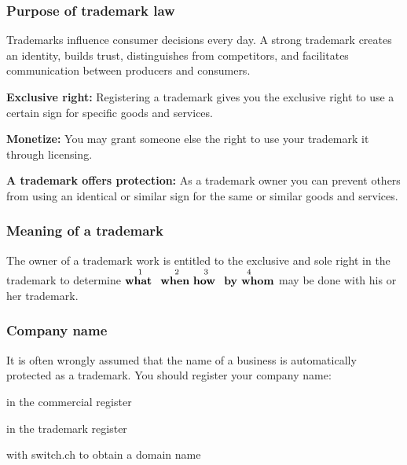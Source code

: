 \subsubsection{Purpose of trademark law}
Trademarks influence consumer decisions every day. A strong trademark creates an identity, builds trust, distinguishes from competitors, and facilitates communication between producers and consumers.
\begin{compactitem}
	\item \textbf{Exclusive right:} Registering a trademark gives you the exclusive right to use a certain sign for specific goods and services.
	\item \textbf{Monetize:} You may grant someone else the right to use your trademark it through licensing.
	\item \textbf{A trademark offers protection:} As a trademark owner you can prevent others from using an identical or
	similar sign for the same or similar goods and services.
\end{compactitem}

\subsubsection{Meaning of a trademark}
The owner of a trademark work is entitled to the exclusive and sole right in the trademark to determine $\overset{1}{\text{\textbf{what} }}$ $ \overset{2}{\text{\textbf{when} }} \overset{3}{\text{\textbf{how} }}$ $\overset{4}{\text{\textbf{by whom}}}$ may be done with his or her trademark.

\subsubsection{Company name}
It is often wrongly assumed that the name of a business is automatically protected as a trademark. You should register your company name:
\begin{compactitem}
	\item in the commercial register
	\item in the trademark register
	\item with switch.ch to obtain a domain name
\end{compactitem}

